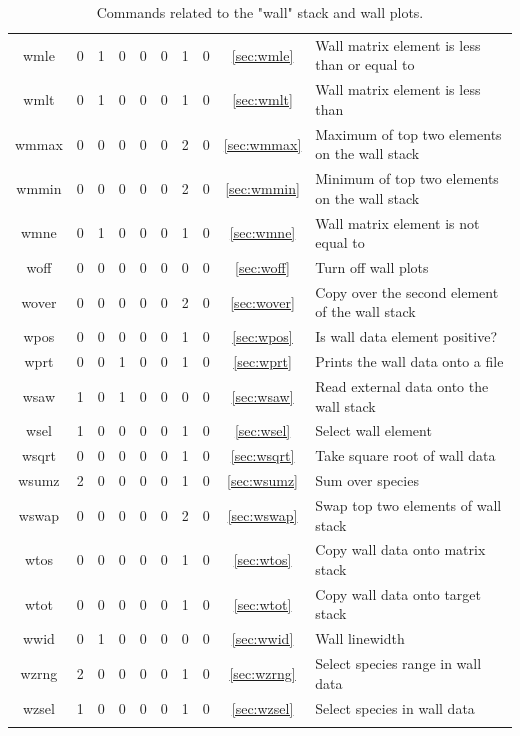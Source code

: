 \documentclass[a4paper,10pt]{report}
\begin{document}
\begin{center}
\begin{longtable}{|c|c|c|c|c|c|c|c|c|l|}
    wmle \index{b2plot, wmle}     & 0 & 1 & 0 & 0 & 0 & 1 & 0 & \ref{sec:wmle}     & Wall matrix element is less than or equal to \\
    wmlt \index{b2plot, wmlt}     & 0 & 1 & 0 & 0 & 0 & 1 & 0 & \ref{sec:wmlt}     & Wall matrix element is less than \\
    wmmax \index{b2plot, wmmax}   & 0 & 0 & 0 & 0 & 0 & 2 & 0 & \ref{sec:wmmax}    & Maximum of top two elements on the wall stack \\
    wmmin \index{b2plot, wmmin}   & 0 & 0 & 0 & 0 & 0 & 2 & 0 & \ref{sec:wmmin}    & Minimum of top two elements on the wall stack \\
    wmne \index{b2plot, wmne}     & 0 & 1 & 0 & 0 & 0 & 1 & 0 & \ref{sec:wmne}     & Wall matrix element is not equal to \\
    woff \index{b2plot, woff}     & 0 & 0 & 0 & 0 & 0 & 0 & 0 & \ref{sec:woff}     & Turn off wall plots \\
    wover \index{b2plot, wover}   & 0 & 0 & 0 & 0 & 0 & 2 & 0 & \ref{sec:wover}    & Copy over the second element of the wall stack \\
    wpos \index{b2plot, wpos}     & 0 & 0 & 0 & 0 & 0 & 1 & 0 & \ref{sec:wpos}     & Is wall data element positive? \\
    wprt \index{b2plot, wprt}     & 0 & 0 & 1 & 0 & 0 & 1 & 0 & \ref{sec:wprt}     & Prints the wall data onto a file \\
    wsaw \index{b2plot, wsaw}     & 1 & 0 & 1 & 0 & 0 & 0 & 0 & \ref{sec:wsaw}     & Read external data onto the wall stack \\
    wsel \index{b2plot, wsel}     & 1 & 0 & 0 & 0 & 0 & 1 & 0 & \ref{sec:wsel}     & Select wall element \\
    wsqrt \index{b2plot, wsqrt}   & 0 & 0 & 0 & 0 & 0 & 1 & 0 & \ref{sec:wsqrt}    & Take square root of wall data \\
    wsumz \index{b2plot, wsumz}   & 2 & 0 & 0 & 0 & 0 & 1 & 0 & \ref{sec:wsumz}    & Sum over species \\
    wswap \index{b2plot, wswap}   & 0 & 0 & 0 & 0 & 0 & 2 & 0 & \ref{sec:wswap}    & Swap top two elements of wall stack \\
    wtos \index{b2plot, wtos}     & 0 & 0 & 0 & 0 & 0 & 1 & 0 & \ref{sec:wtos}     & Copy wall data onto matrix stack \\
    wtot \index{b2plot, wtot}     & 0 & 0 & 0 & 0 & 0 & 1 & 0 & \ref{sec:wtot}     & Copy wall data onto target stack \\
    wwid \index{b2plot, wwid}     & 0 & 1 & 0 & 0 & 0 & 0 & 0 & \ref{sec:wwid}     & Wall linewidth \\
    wzrng \index{b2plot, wzrng}   & 2 & 0 & 0 & 0 & 0 & 1 & 0 & \ref{sec:wzrng}    & Select species range in wall data \\
    wzsel \index{b2plot, wzsel}   & 1 & 0 & 0 & 0 & 0 & 1 & 0 & \ref{sec:wzsel}    & Select species in wall data \\
    \hline
    \caption{Commands related to the "wall" stack and wall plots.}
    \label{tab:wallcommands}
  \end{longtable}
\end{center}
\end{document}

